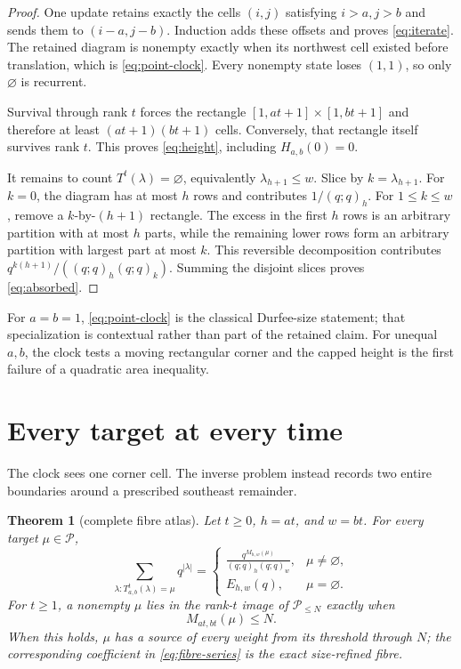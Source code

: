 \documentclass[a4paper,10pt]{amsart}
\newtheorem{theorem}{Theorem}
\theoremstyle{remark}
\newcommand{\Part}{\mathcal P}
\newcommand{\emptypar}{\varnothing}
\newcommand{\qfac}[1]{(q;q)_{#1}}
\begin{document}
\begin{proof}
One update retains exactly the cells $(i,j)$ satisfying $i>a,j>b$ and sends
them to $(i-a,j-b)$.  Induction adds these offsets and proves
\eqref{eq:iterate}.  The retained diagram is nonempty exactly when its
northwest cell existed before translation, which is \eqref{eq:point-clock}.
Every nonempty state loses $(1,1)$, so only $\emptypar$ is recurrent.

Survival through rank $t$ forces the rectangle
$[1,at+1]\times[1,bt+1]$ and therefore at least
$(at+1)(bt+1)$ cells.  Conversely, that rectangle itself survives rank $t$.
This proves \eqref{eq:height}, including $H_{a,b}(0)=0$.

It remains to count $T^t(\lambda)=\emptypar$, equivalently
$\lambda_{h+1}\leq w$.  Slice by $k=\lambda_{h+1}$.  For $k=0$, the diagram
has at most $h$ rows and contributes $1/\qfac h$.  For $1\leq k\leq w$,
remove a $k$-by-$(h+1)$ rectangle.  The excess in the first $h$ rows is an
arbitrary partition with at most $h$ parts, while the remaining lower rows
form an arbitrary partition with largest part at most $k$.  This reversible
decomposition contributes
$q^{k(h+1)}/(\qfac h\qfac k)$.  Summing the disjoint slices proves
\eqref{eq:absorbed}.
\end{proof}

For $a=b=1$, \eqref{eq:point-clock} is the classical Durfee-size statement;
that specialization is contextual rather than part of the retained claim.
For unequal $a,b$, the clock tests a moving rectangular corner and the capped
height is the first failure of a quadratic area inequality.

\section{Every target at every time}\label{sec:fibres}

The clock sees one corner cell.  The inverse problem instead records two
entire boundaries around a prescribed southeast remainder.

\begin{theorem}[complete fibre atlas]\label{thm:fibres}
Let $t\geq0$, $h=at$, and $w=bt$.  For every target $\mu\in\Part$,
\begin{equation}\label{eq:fibre-series}
 \sum_{\lambda:T_{a,b}^{t}(\lambda)=\mu}q^{|\lambda|}
 =\begin{cases}
 \displaystyle
  \frac{q^{M_{h,w}(\mu)}}{\qfac h\qfac w},&\mu\ne\emptypar,\\[7pt]
 E_{h,w}(q),&\mu=\emptypar.
 \end{cases}
\end{equation}
For $t\geq1$, a nonempty $\mu$ lies in the rank-$t$ image of
$\Part_{\leq N}$ exactly when
\begin{equation}\label{eq:image-threshold}
 M_{at,bt}(\mu)\leq N.
\end{equation}
When this holds, $\mu$ has a source of every weight from its threshold through
$N$; the corresponding coefficient in \eqref{eq:fibre-series} is the exact
size-refined fibre.
\end{theorem}
\end{document}
